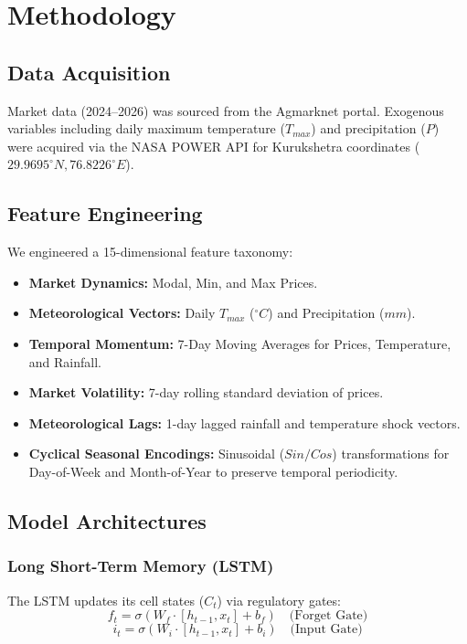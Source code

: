 \documentclass[11pt, a4paper]{article}
\begin{document}
\section{Methodology}
\subsection{Data Acquisition}
Market data (2024--2026) was sourced from the Agmarknet portal. Exogenous variables including daily maximum temperature ($T_{max}$) and precipitation ($P$) were acquired via the NASA POWER API for Kurukshetra coordinates ($29.9695^{\circ}N, 76.8226^{\circ}E$).

\subsection{Feature Engineering}
We engineered a 15-dimensional feature taxonomy:
\begin{itemize}[label=-]
    \item \textbf{Market Dynamics:} Modal, Min, and Max Prices.
    \item \textbf{Meteorological Vectors:} Daily $T_{max}$ ($^{\circ}C$) and Precipitation ($mm$).
    \item \textbf{Temporal Momentum:} 7-Day Moving Averages for Prices, Temperature, and Rainfall.
    \item \textbf{Market Volatility:} 7-day rolling standard deviation of prices.
    \item \textbf{Meteorological Lags:} 1-day lagged rainfall and temperature shock vectors.
    \item \textbf{Cyclical Seasonal Encodings:} Sinusoidal ($Sin/Cos$) transformations for Day-of-Week and Month-of-Year to preserve temporal periodicity.
\end{itemize}

\subsection{Model Architectures}
\subsubsection{Long Short-Term Memory (LSTM)}
The LSTM updates its cell states ($C_t$) via regulatory gates:
\begin{equation}
    f_t = \sigma(W_f \cdot [h_{t-1}, x_t] + b_f) \quad \text{(Forget Gate)}
\end{equation}
\begin{equation}
    i_t = \sigma(W_i \cdot [h_{t-1}, x_t] + b_i) \quad \text{(Input Gate)}
\end{equation}
\end{document}
